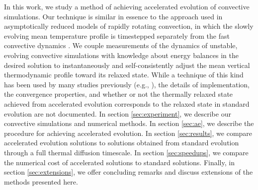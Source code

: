 \documentclass[aps, pre, onecolumn, nofootinbib, notitlepage, groupedaddress, amsfonts, amssymb, amsmath, longbibliography]{revtex4-1}
\begin{document}
In this work, we study a method of achieving accelerated evolution of
convective simulations. 
Our technique is similar in essence to the approach used in asymptotically 
reduced models of rapidly rotating convection, in which the
slowly evolving mean temperature profile is timestepped separately from the
fast convective dynamics \cite{julien&all1998, sprague&all2006}. 
We couple measurements of the dynamics of unstable, evolving
convective simulations with knowledge about energy balances in the desired solution
to instantaneously and self-consistently adjust the mean vertical thermodynamic 
profile toward its relaxed state. 
While a technique of this kind has been used by many studies previously 
(e.g., \cite{hurlburt&all1986}),
the details of implementation, the convergence properties, and whether or not the
thermally relaxed state achieved from 
accelerated evolution corresponds to the relaxed state in standard evolution 
are not documented.
In section \ref{sec:experiment}, we describe our convective simulations and
numerical methods. In section \ref{sec:ae}, we describe the procedure for 
achieving accelerated evolution. In
section \ref{sec:results}, we compare accelerated evolution solutions
to solutions obtained from standard evolution through a full thermal diffusion timescale. 
In section \ref{sec:speedups}, we compare the numerical cost of accelerated
solutions to standard solutions.
Finally,
in section \ref{sec:extensions}, we offer concluding remarks and
discuss extensions of the methods presented here.


\end{document}
